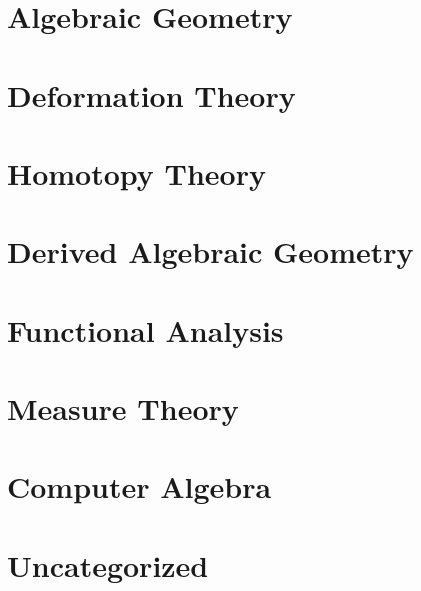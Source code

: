 \documentclass{report}
\begin{document}
\chapter{Algebraic Geometry}
\renewcommand{\cat}{AG}








\chapter{Deformation Theory}
\renewcommand{\cat}{DT}


\chapter{Homotopy Theory}
\renewcommand{\cat}{HT}




\chapter{Derived Algebraic Geometry}
\renewcommand{\cat}{DAG}


\chapter{Functional Analysis}
\renewcommand{\cat}{FA}


\chapter{Measure Theory}
\renewcommand{\cat}{MT}


\chapter{Computer Algebra}
\renewcommand{\cat}{CP}


\chapter{Uncategorized}
\renewcommand{\cat}{UN}

\end{document}
